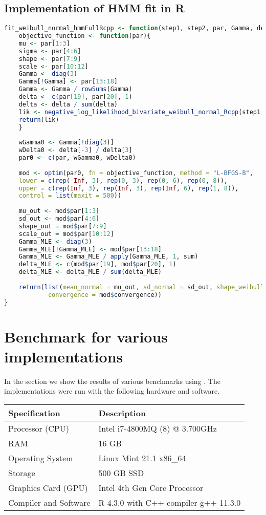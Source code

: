 \subsection{Implementation of HMM fit in R}
\begin{lstlisting}[language = R]
fit_weibull_normal_hmmFullRcpp <- function(step1, step2, par, Gamma, delta, covarianceMatrix = NULL, eps = 0.001) { 
    objective_function <- function(par){
    mu <- par[1:3]
    sigma <- par[4:6]
    shape <- par[7:9] 
    scale <- par[10:12]
    Gamma <- diag(3) 
    Gamma[!Gamma] <- par[13:18]
    Gamma <- Gamma / rowSums(Gamma)
    delta <- c(par[19], par[20], 1)
    delta <- delta / sum(delta)
    lik <- negative_log_likelihood_bivariate_weibull_normal_Rcpp(step1, step2, mu, sigma, shape, scale, Gamma, covarianceMatrix, delta, eps)
    return(lik)
    }
        
    wGamma0 <- Gamma[!diag(3)]
    wDelta0 <- delta[-3] / delta[3]
    par0 <- c(par, wGamma0, wDelta0)
    
    mod <- optim(par0, fn = objective_function, method = "L-BFGS-B",
    lower = c(rep(-Inf, 3), rep(0, 3), rep(0, 6), rep(0, 8)),
    upper = c(rep(Inf, 3), rep(Inf, 3), rep(Inf, 6), rep(1, 8)),
    control = list(maxit = 500))
    
    mu_out <- mod$par[1:3]
    sd_out <- mod$par[4:6] 
    shape_out = mod$par[7:9]
    scale_out = mod$par[10:12]
    Gamma_MLE <- diag(3)
    Gamma_MLE[!Gamma_MLE] <- mod$par[13:18] 
    Gamma_MLE <- Gamma_MLE / apply(Gamma_MLE, 1, sum)
    delta_MLE <- c(mod$par[19], mod$par[20], 1)
    delta_MLE <- delta_MLE / sum(delta_MLE)
        
    return(list(mean_normal = mu_out, sd_normal = sd_out, shape_weibull = shape_out,scale_weibull = scale_out, Gamma = Gamma_MLE, delta = delta_MLE, numIter = mod$counts, minimum = mod$value,
            convergence = mod$convergence))
}
\end{lstlisting}
\newpage
\section{Benchmark for various implementations}\label{benchmarkSection}
In the section we show the results of various benchmarks using \cite{microbenchmark}. The implementations were run with the following hardware and software.
\begin{table}[ht]
    \centering
    \begin{tabular}{ll}
      \hline
      \textbf{Specification} & \textbf{Description} \\
      \hline
      Processor (CPU) & Intel i7-4800MQ (8) @ 3.700GHz \\
      RAM & 16 GB \\
      Operating System & Linux Mint 21.1 x86\_64 \\
      Storage & 500 GB SSD \\
      Graphics Card (GPU) & Intel 4th Gen Core Processor \\
      Compiler and Software & R 4.3.0 with C++ compiler g++ 11.3.0\\
      \hline
    \end{tabular}
  \end{table}
